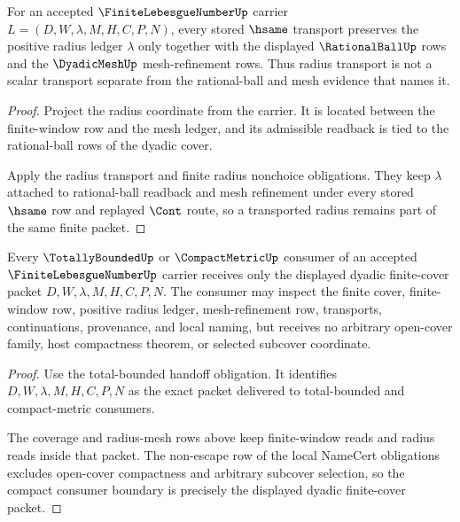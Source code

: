 \begin{theorem}
\label{thm:finite-lebesgue-number-radius-mesh-stability-row}
For an accepted $\FiniteLebesgueNumberUp$ carrier $L=(D,W,\lambda,M,H,C,P,N)$, every stored $\hsame$ transport preserves the positive radius ledger $\lambda$ only together with the displayed $\RationalBallUp$ rows and the $\DyadicMeshUp$ mesh-refinement rows. Thus radius transport is not a scalar transport separate from the rational-ball and mesh evidence that names it.
\end{theorem}
\begin{proof}
Project the radius coordinate from the carrier. It is located between the finite-window row and the mesh ledger, and its admissible readback is tied to the rational-ball rows of the dyadic cover.

Apply the radius transport and finite radius nonchoice obligations. They keep $\lambda$ attached to rational-ball readback and mesh refinement under every stored $\hsame$ row and replayed $\Cont$ route, so a transported radius remains part of the same finite packet.
\end{proof}

\begin{theorem}
\label{thm:finite-lebesgue-number-compact-consumer-boundary-row}
Every $\TotallyBoundedUp$ or $\CompactMetricUp$ consumer of an accepted $\FiniteLebesgueNumberUp$ carrier receives only the displayed dyadic finite-cover packet $D,W,\lambda,M,H,C,P,N$. The consumer may inspect the finite cover, finite-window row, positive radius ledger, mesh-refinement row, transports, continuations, provenance, and local naming, but receives no arbitrary open-cover family, host compactness theorem, or selected subcover coordinate.
\end{theorem}
\begin{proof}
Use the total-bounded handoff obligation. It identifies $D,W,\lambda,M,H,C,P,N$ as the exact packet delivered to total-bounded and compact-metric consumers.

The coverage and radius-mesh rows above keep finite-window reads and radius reads inside that packet. The non-escape row of the local NameCert obligations excludes open-cover compactness and arbitrary subcover selection, so the compact consumer boundary is precisely the displayed dyadic finite-cover packet.
\end{proof}

